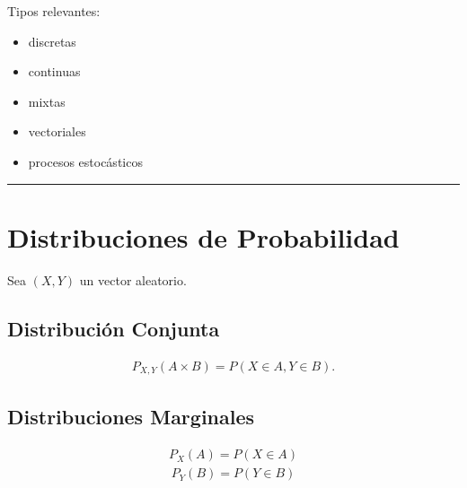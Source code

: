 \documentclass[letterpaper,10pt,english]{jupyterBook}
\begin{document}
\sphinxAtStartPar
Tipos relevantes:
\begin{itemize}
\item {} 
\sphinxAtStartPar
discretas

\item {} 
\sphinxAtStartPar
continuas

\item {} 
\sphinxAtStartPar
mixtas

\item {} 
\sphinxAtStartPar
vectoriales

\item {} 
\sphinxAtStartPar
procesos estocásticos

\end{itemize}


\bigskip\hrule\bigskip



\section{Distribuciones de Probabilidad}
\label{\detokenize{02_mathematical_foundations/formal_definitions:distribuciones-de-probabilidad}}
\sphinxAtStartPar
Sea \((X,Y)\) un vector aleatorio.


\subsection{Distribución Conjunta}
\label{\detokenize{02_mathematical_foundations/formal_definitions:distribucion-conjunta}}\begin{equation*}
\begin{split}
P_{X,Y}(A\times B)=P(X\in A, Y\in B).
\end{split}
\end{equation*}

\subsection{Distribuciones Marginales}
\label{\detokenize{02_mathematical_foundations/formal_definitions:distribuciones-marginales}}\begin{equation*}
\begin{split}
P_X(A)=P(X\in A)
\end{split}
\end{equation*}\begin{equation*}
\begin{split}
P_Y(B)=P(Y\in B)
\end{split}
\end{equation*}
\end{document}

